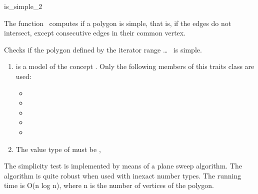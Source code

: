 

\begin{ccRefFunction}{is_simple_2} 


\ccDefinition
  
The function \ccRefName\ computes if a polygon is simple, that is, if the edges 
do not intersect, except consecutive edges in their common vertex.


{
Checks if the polygon defined by the
iterator range  \ldots\  is simple.
}


\begin{enumerate}
    \item {} is a model of the concept 
	  .
	  Only the following members of this traits class are used:
          \begin{itemize}
            \item {}
            \item {}
            \item {}
            \item {}
            \item {}
          \end{itemize}
    \item The value type of  must be ,
\end{enumerate}

\ccImplementation

The simplicity test is implemented by means of a plane sweep algorithm.
The algorithm is quite robust when used with inexact number types.
The running time is O(n log n), where n is the number of vertices of the
polygon.

\ccSeeAlso

 \\
 \\


\end{ccRefFunction}


